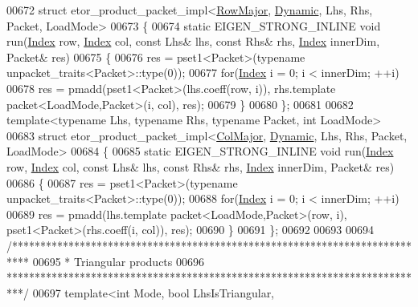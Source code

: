 \begin{DoxyCode}
00672 \textcolor{keyword}{struct }etor\_product\_packet\_impl<\hyperlink{group__enums_ggaacded1a18ae58b0f554751f6cdf9eb13acfcde9cd8677c5f7caf6bd603666aae3}{RowMajor}, \hyperlink{namespace_eigen_ad81fa7195215a0ce30017dfac309f0b2}{Dynamic}, Lhs, Rhs, Packet, LoadMode>
00673 \{
00674   \textcolor{keyword}{static} EIGEN\_STRONG\_INLINE \textcolor{keywordtype}{void} run(\hyperlink{namespace_eigen_a62e77e0933482dafde8fe197d9a2cfde}{Index} row, \hyperlink{namespace_eigen_a62e77e0933482dafde8fe197d9a2cfde}{Index} col, \textcolor{keyword}{const} Lhs& lhs, \textcolor{keyword}{const} Rhs& rhs, 
      \hyperlink{namespace_eigen_a62e77e0933482dafde8fe197d9a2cfde}{Index} innerDim, Packet& res)
00675   \{
00676     res = pset1<Packet>(\textcolor{keyword}{typename} unpacket\_traits<Packet>::type(0));
00677     \textcolor{keywordflow}{for}(\hyperlink{namespace_eigen_a62e77e0933482dafde8fe197d9a2cfde}{Index} i = 0; i < innerDim; ++i)
00678       res =  pmadd(pset1<Packet>(lhs.coeff(row, i)), rhs.template packet<LoadMode,Packet>(i, col), res);
00679   \}
00680 \};
00681 
00682 \textcolor{keyword}{template}<\textcolor{keyword}{typename} Lhs, \textcolor{keyword}{typename} Rhs, \textcolor{keyword}{typename} Packet, \textcolor{keywordtype}{int} LoadMode>
00683 \textcolor{keyword}{struct }etor\_product\_packet\_impl<\hyperlink{group__enums_ggaacded1a18ae58b0f554751f6cdf9eb13a0cbd4bdd0abcfc0224c5fcb5e4f6669a}{ColMajor}, \hyperlink{namespace_eigen_ad81fa7195215a0ce30017dfac309f0b2}{Dynamic}, Lhs, Rhs, Packet, LoadMode>
00684 \{
00685   \textcolor{keyword}{static} EIGEN\_STRONG\_INLINE \textcolor{keywordtype}{void} run(\hyperlink{namespace_eigen_a62e77e0933482dafde8fe197d9a2cfde}{Index} row, \hyperlink{namespace_eigen_a62e77e0933482dafde8fe197d9a2cfde}{Index} col, \textcolor{keyword}{const} Lhs& lhs, \textcolor{keyword}{const} Rhs& rhs, 
      \hyperlink{namespace_eigen_a62e77e0933482dafde8fe197d9a2cfde}{Index} innerDim, Packet& res)
00686   \{
00687     res = pset1<Packet>(\textcolor{keyword}{typename} unpacket\_traits<Packet>::type(0));
00688     \textcolor{keywordflow}{for}(\hyperlink{namespace_eigen_a62e77e0933482dafde8fe197d9a2cfde}{Index} i = 0; i < innerDim; ++i)
00689       res =  pmadd(lhs.template packet<LoadMode,Packet>(row, i), pset1<Packet>(rhs.coeff(i, col)), res);
00690   \}
00691 \};
00692 
00693 
00694 \textcolor{comment}{/***************************************************************************}
00695 \textcolor{comment}{* Triangular products}
00696 \textcolor{comment}{***************************************************************************/}
00697 \textcolor{keyword}{template}<\textcolor{keywordtype}{int} Mode, \textcolor{keywordtype}{bool} LhsIsTriangular,

\end{DoxyCode}
